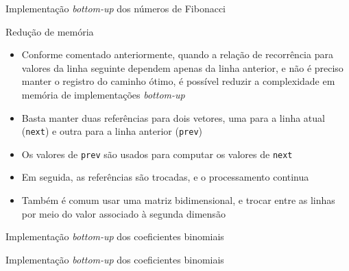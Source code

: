 \begin{frame}[fragile]{Implementação {\it bottom-up} dos números de Fibonacci}
\end{frame}

\begin{frame}[fragile]{Redução de memória}

    \begin{itemize}
        \item Conforme comentado anteriormente, quando a relação de recorrência para valores da
            linha seguinte dependem apenas da linha anterior, e não é preciso manter o registro
            do caminho ótimo, é possível reduzir a complexidade em memória de implementações
           \textit{bottom-up}

        \item Basta manter duas referências para dois vetores, uma para a linha atual
            (\texttt{next}) e outra para a linha anterior (\texttt{prev})

        \item Os valores de \texttt{prev} são usados para computar os valores de \texttt{next}

        \item Em seguida, as referências são trocadas, e o processamento continua

        \item Também é comum usar uma matriz bidimensional, e trocar entre as linhas por meio
            do valor associado à segunda dimensão
    \end{itemize}

\end{frame}

\begin{frame}[fragile]{Implementação {\it bottom-up} dos coeficientes binomiais}
\end{frame}

\begin{frame}[fragile]{Implementação {\it bottom-up} dos coeficientes binomiais}
\end{frame}
